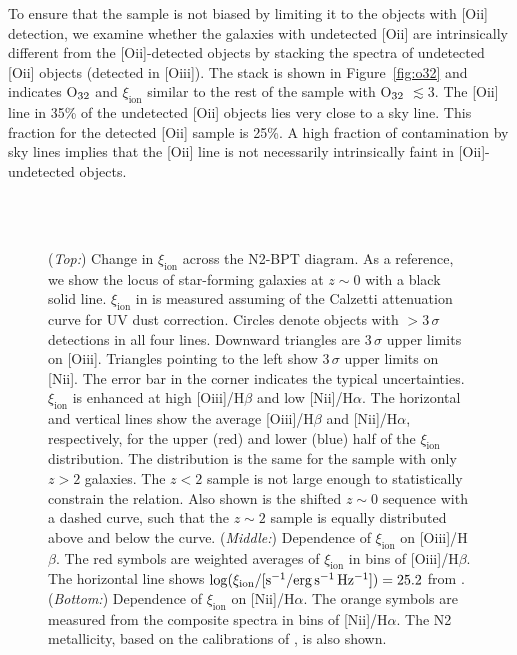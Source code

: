 \documentclass[iop]{emulateapj}
\newcommand{\xiion}{\ensuremath{\xi_{\mathrm{ion}}}}
\newcommand{\halpha}{H\ensuremath{\alpha}}
\newcommand{\hbeta}{H\ensuremath{\beta}}
\def\o32{{O$_{\rm 32}$}}
\begin{document}
To ensure that the sample is not biased by limiting it to the objects with [O{\sc ii}] detection, we examine whether the galaxies with undetected [O{\sc ii}] are intrinsically different from the [O{\sc ii}]-detected objects by stacking the spectra of undetected [O{\sc ii}] objects (detected in [O{\sc iii}]). The stack is shown in Figure~\ref{fig:o32} and indicates {\o32} and {\xiion} similar to the rest of the sample with {\o32} $\lesssim 3$. The [O{\sc ii}] line in 35\% of the undetected [O{\sc ii}] objects lies very close to a sky line. This fraction for the detected [O{\sc ii}] sample is 25\%. A high fraction of contamination by sky lines implies that the [O{\sc ii}] line is not necessarily intrinsically faint in [O{\sc ii}]-undetected objects. 

\begin{figure}[tbp]
	\\
	\\
		\caption{ ({\em Top:}) 
		Change in {\xiion} across the N2-BPT diagram. As a reference, we show the locus of star-forming galaxies at $z\sim 0$ \citep{kewley13} with a black solid line. 
		{\xiion} in is measured assuming of the Calzetti attenuation curve for UV dust correction.
		Circles denote objects with $> 3\,\sigma$ detections in all four lines. Downward triangles are $3\,\sigma$ upper limits on [O{\sc iii}]. Triangles pointing to the left show $3\,\sigma$ upper limits on [N{\sc ii}].
		The error bar in the corner indicates the typical uncertainties.
		{\xiion} is enhanced at high [O{\sc iii}]/{\hbeta} and low [N{\sc ii}]/{\halpha}. The horizontal and vertical lines show the average [O{\sc iii}]/{\hbeta} and [N{\sc ii}]/{\halpha}, respectively, for the upper (red) and lower (blue) half of the {\xiion} distribution. The distribution is the same for the sample with only $z>2$ galaxies. The $z<2$ sample is not large enough to statistically constrain the relation.
		Also shown is the shifted $z\sim 0$ sequence with a dashed curve, such that the $z\sim 2$ sample is equally distributed above and below the curve.
		({\em Middle:}) Dependence of {\xiion} on [O{\sc iii}]/{\hbeta}. The red symbols are weighted averages of {\xiion} in bins of [O{\sc iii}]/{\hbeta}. 
		The horizontal line shows $\log(\xi_{\rm{ion}}/[{\rm{s^{-1}/erg\,s^{-1}\,Hz^{-1}}}])=25.2$ from \citet{robertson13}.
		({\em Bottom:}) Dependence of {\xiion} on [N{\sc ii}]/{\halpha}. The orange symbols are measured from the composite spectra in bins of [N{\sc ii}]/{\halpha}. 
		The N2 metallicity, based on the calibrations of \citet{pp04}, is also shown.
		}
		\label{fig:bpt}
\end{figure}
\end{document}

